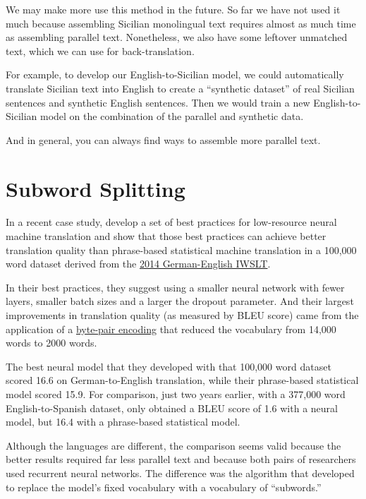 \documentclass[10pt,letterpaper]{article}
\begin{document}
We may make more use this method in the future. So far we have not used it much because
assembling Sicilian monolingual text requires almost as much time as assembling parallel text.
Nonetheless, we also have some leftover unmatched text, which we can use for back-translation.

For example, to develop our English-to-Sicilian model, we could automatically translate
Sicilian text into English to create a ``synthetic dataset'' of real Sicilian sentences
and synthetic English sentences.  Then we would train a new English-to-Sicilian model on the
combination of the parallel and synthetic data.

And in general, you can always find ways to assemble more parallel text.



\hypertarget{subword}{}

\section*{Subword Splitting}

In a recent case study, \citet{sennrich2019loresnmt}
develop a set of best practices for low-resource neural machine translation and
show that those best practices can achieve better translation quality than
phrase-based statistical machine translation in a 100,000 word dataset derived from the
\href{https://sites.google.com/site/iwsltevaluation2014/}{2014 German-English IWSLT}.

In their best practices, they suggest using a smaller neural network with fewer layers,
smaller batch sizes and a larger the dropout parameter.  And their largest improvements
in translation quality (as measured by BLEU score) came from the application of a
\href{https://github.com/rsennrich/subword-nmt}{byte-pair encoding}
that reduced the vocabulary from 14,000 words to 2000 words.

The best neural model that they developed with that 100,000 word dataset scored 16.6
on German-to-English translation, while their phrase-based statistical model scored 15.9.
For comparison, just two years earlier, with a 377,000 word English-to-Spanish dataset,
\citet{koehnknowles2017} only obtained a BLEU score of 1.6 with a neural model,
but 16.4 with a phrase-based statistical model.

Although the languages are different, the comparison seems valid because the better results required 
far less parallel text and because both pairs of researchers used recurrent neural networks.
The difference was the algorithm that \citet{sennrich2016subword}
developed to replace the model's fixed vocabulary with a vocabulary of ``subwords.''
\end{document}
